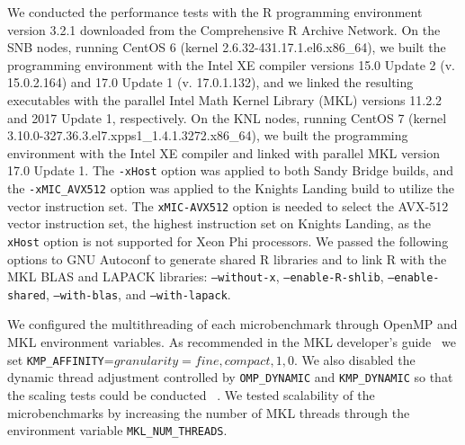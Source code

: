 We conducted the performance tests with the R programming environment version 3.2.1
downloaded from the Comprehensive R Archive Network. On the SNB nodes, running CentOS 6
(kernel 2.6.32-431.17.1.el6.x86\_64), we built the programming environment with the Intel
XE compiler versions 15.0 Update 2 (v. 15.0.2.164) and 17.0 Update 1 (v. 17.0.1.132), and
we linked the resulting executables with the parallel Intel Math Kernel Library (MKL)
versions 11.2.2 and 2017 Update 1, respectively. On the KNL nodes, running CentOS 7
(kernel 3.10.0-327.36.3.el7.xpps1\_1.4.1.3272.x86\_64), we built the programming
environment with the Intel XE compiler and linked with parallel MKL version 17.0 Update 1.
The \texttt{-xHost} option was applied to both Sandy Bridge builds, and the
\texttt{-xMIC\_AVX512} option was applied to the Knights Landing build to utilize the
vector instruction set. The \texttt{xMIC-AVX512} option is needed to select the AVX-512
vector instruction set, the highest instruction set on Knights Landing, as the
\texttt{xHost} option is not supported for Xeon Phi processors. We passed the following
options to GNU Autoconf to generate shared R libraries and to link R with the MKL BLAS and
LAPACK libraries: \texttt{--without-x}, \texttt{--enable-R-shlib},
\texttt{--enable-shared}, \texttt{--with-blas}, and \texttt{--with-lapack}.

We configured the multithreading of each microbenchmark through OpenMP and MKL
  environment variables.
As recommended in the MKL developer's guide~\cite{intel:mkl2017} we set
  \texttt{KMP\_AFFINITY}=$granularity=fine,compact,1,0$.
We also disabled the dynamic thread adjustment controlled by
  \texttt{OMP\_DYNAMIC} and \texttt{KMP\_DYNAMIC} so that the scaling tests
  could be conducted
  ~\cite{intel:cpp2015, intel:cpp2017, intel:mkl11_2, intel:mkl2017}.
We tested scalability of the microbenchmarks by increasing the number of MKL
  threads through the environment variable \texttt{MKL\_NUM\_THREADS}.

